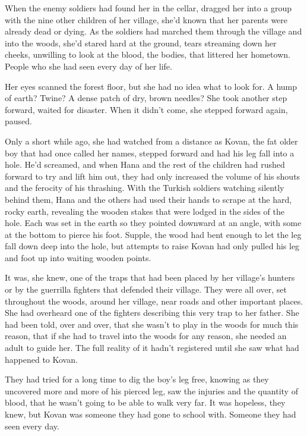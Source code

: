 When the enemy soldiers had found her in the cellar, dragged her into a group with the nine other children of her village, she'd known that her parents were already dead or dying.  As the soldiers had marched them through the village and into the woods, she'd stared hard at the ground, tears streaming down her cheeks, unwilling to look at the blood, the bodies, that littered her hometown.  People who she had seen every day of her life.



Her eyes scanned the forest floor, but she had no idea what to look for.  A hump of earth?  Twine?  A dense patch of dry, brown needles?  She took another step forward, waited for disaster.  When it didn't come, she stepped forward again, paused.



Only a short while ago, she had watched from a distance as Kovan, the fat older boy that had once called her names, stepped forward and had his leg fall into a hole.  He'd screamed, and when Hana and the rest of the children had rushed forward to try and lift him out, they had only increased the volume of his shouts and the ferocity of his thrashing.  With the Turkish soldiers watching silently behind them, Hana and the others had used their hands to scrape at the hard, rocky earth, revealing the wooden stakes that were lodged in the sides of the hole.  Each was set in the earth so they pointed downward at an angle, with some at the bottom to pierce his foot.  Supple, the wood had bent enough to let the leg fall down deep into the hole, but attempts to raise Kovan had only pulled his leg and foot up into waiting wooden points.



It was, she knew, one of the traps that had been placed by her village's hunters or by the guerrilla fighters that defended their village.  They were all over, set throughout the woods, around her village, near roads and other important places.  She had overheard one of the fighters describing this very trap to her father.  She had been told, over and over, that she wasn't to play in the woods for much this reason, that if she had to travel into the woods for any reason, she needed an adult to guide her.  The full reality of it hadn't registered until she saw what had happened to Kovan.



They had tried for a long time to dig the boy's leg free, knowing as they uncovered more and more of his pierced leg, saw the injuries and the quantity of blood, that he wasn't going to be able to walk very far.  It was hopeless, they knew, but Kovan was someone they had gone to school with.  Someone they had seen every day.



